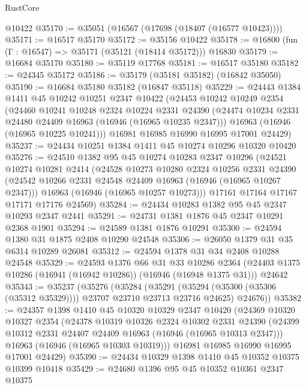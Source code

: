 \begin{lexlean}{RustCore}
\begin{coremodule}
    @10422
@35170 := @35051 (@16567 (@17698 (@18407 (@16577 @10423))))
@35171 := @16517 @35170
@35172 := @35156 @10422
@35178 := @16800 (fun (Γ : @16547) => @35171 (@35121 (@18414 @35172))) @16830
@35179 := @16684 @35170
@35180 := @35119 @17768
@35181 := @16517 @35180
@35182 := @24345 @35172
@35186 := @35179 (@35181 @35182) (@16842 @35050)
@35190 := @16684 @35180 @35182 (@16847 @35118)
@35229 := @24443
    @1384
    @1411
    @45
    @10242
    @10251
    @2347
    @10422
    (@24453
      @10242
      @10249
      @2354
      (@24460
        @10241
        @10248
        @2324
        @10224
        @2331
        @24390
        (@24474 @10234 @2331 @24480 @24409 @16963 (@16946 (@16965 @10235 @2347)))
        @16963
        (@16946 (@16965 @10225 @10241)))
      @16981
      @16985
      @16990
      @16995
      @17001
      @24429)
@35237 := @24434 @10251 @1384 @1411 @45 @10274 @10296 @10320 @10420
@35276 := @24510
    @1382
    @95
    @45
    @10274
    @10283
    @2347
    @10296
    (@24521
      @10274
      @10281
      @2414
      (@24528
        @10273
        @10280
        @2324
        @10256
        @2331
        @24390
        (@24542 @10266 @2331 @24548 @24409 @16963 (@16946 (@16965 @10267 @2347)))
        @16963
        (@16946 (@16965 @10257 @10273)))
      @17161
      @17164
      @17167
      @17171
      @17176
      @24569)
@35284 := @24434 @10283 @1382 @95 @45 @2347 @10293 @2347 @2441
@35291 := @24731 @1381 @1876 @45 @2347 @10291 @2368 @1901
@35294 := @24589 @1381 @1876 @10291
@35300 := @24594 @1380 @31 @1875 @2408 @10290 @24548
@35306 := @26050 @1379 @31 @35 @6314 @10289 @26081
@35312 := @24594 @1378 @31 @34 @2408 @10288 @24548
@35329 := @24593
    @1376
    @66
    @31
    @33
    @10286
    @2364
    (@24403 @1375 @10286 (@16941 (@16942 @10286)) (@16946 (@16948 @1375 @31)))
    @24642
@35343 := @35237
    (@35276
      (@35284
        (@35291 (@35294 (@35300 (@35306 (@35312 @35329)))) @23707 @23710 @23713 @23716 @24625)
        @24676))
@35382 := @24357
    @1398
    @1410
    @45
    @10320
    @10329
    @2347
    @10420
    (@24369
      @10320
      @10327
      @2354
      (@24378
        @10319
        @10326
        @2324
        @10302
        @2331
        @24390
        (@24399 @10312 @2331 @24407 @24409 @16963 (@16946 (@16965 @10313 @2347)))
        @16963
        (@16946 (@16965 @10303 @10319)))
      @16981
      @16985
      @16990
      @16995
      @17001
      @24429)
@35390 := @24434 @10329 @1398 @1410 @45 @10352 @10375 @10399 @10418
@35429 := @24680
    @1396
    @95
    @45
    @10352
    @10361
    @2347
    @10375

\end{coremodule}
\end{lexlean}
